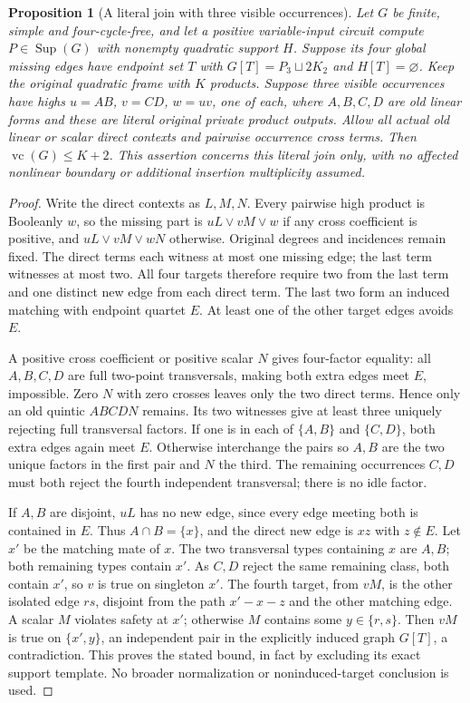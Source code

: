 \documentclass[11pt]{article}
\newcommand{\Sup}{\operatorname{Sup}}
\newcommand{\vc}{\operatorname{vc}}
\newtheorem{proposition}[theorem]{Proposition}
\theoremstyle{definition}
\theoremstyle{remark}
\begin{document}
\begin{proposition}[A literal join with three visible occurrences]\label{prop:literaljoinpath}
Let $G$ be finite, simple and four-cycle-free, and let a positive variable-input circuit compute $P\in\Sup(G)$ with nonempty quadratic support $H$. Suppose its four global missing edges have endpoint set $T$ with $G[T]=P_3\sqcup2K_2$ and $H[T]=\varnothing$. Keep the original quadratic frame with $K$ products. Suppose three visible occurrences have highs $u=AB$, $v=CD$, $w=uv$, one of each, where $A,B,C,D$ are old linear forms and these are literal original private product outputs. Allow all actual old linear or scalar direct contexts and pairwise occurrence cross terms. Then $\vc(G)\le K+2$. This assertion concerns this literal join only, with no affected nonlinear boundary or additional insertion multiplicity assumed.
\end{proposition}
\begin{proof}
Write the direct contexts as $L,M,N$. Every pairwise high product is Booleanly $w$, so the missing part is $uL\vee vM\vee w$ if any cross coefficient is positive, and $uL\vee vM\vee wN$ otherwise. Original degrees and incidences remain fixed. The direct terms each witness at most one missing edge; the last term witnesses at most two. All four targets therefore require two from the last term and one distinct new edge from each direct term. The last two form an induced matching with endpoint quartet $E$. At least one of the other target edges avoids $E$.

A positive cross coefficient or positive scalar $N$ gives four-factor equality: all $A,B,C,D$ are full two-point transversals, making both extra edges meet $E$, impossible. Zero $N$ with zero crosses leaves only the two direct terms. Hence only an old quintic $ABCDN$ remains. Its two witnesses give at least three uniquely rejecting full transversal factors. If one is in each of $\{A,B\}$ and $\{C,D\}$, both extra edges again meet $E$. Otherwise interchange the pairs so $A,B$ are the two unique factors in the first pair and $N$ the third. The remaining occurrences $C,D$ must both reject the fourth independent transversal; there is no idle factor.

If $A,B$ are disjoint, $uL$ has no new edge, since every edge meeting both is contained in $E$. Thus $A\cap B=\{x\}$, and the direct new edge is $xz$ with $z\notin E$. Let $x'$ be the matching mate of $x$. The two transversal types containing $x$ are $A,B$; both remaining types contain $x'$. As $C,D$ reject the same remaining class, both contain $x'$, so $v$ is true on singleton $x'$. The fourth target, from $vM$, is the other isolated edge $rs$, disjoint from the path $x'-x-z$ and the other matching edge. A scalar $M$ violates safety at $x'$; otherwise $M$ contains some $y\in\{r,s\}$. Then $vM$ is true on $\{x',y\}$, an independent pair in the explicitly induced graph $G[T]$, a contradiction. This proves the stated bound, in fact by excluding its exact support template. No broader normalization or noninduced-target conclusion is used.
\end{proof}
\end{document}
